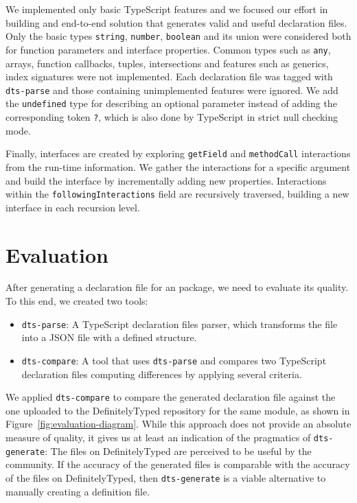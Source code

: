 \documentclass[english,cleveref,autoref,submission]{programming}
\newcommand{\figref}[1]{Figure~\ref{#1}}
\begin{document}
We implemented only basic TypeScript features and we focused our effort in building and end-to-end solution that generates valid and useful declaration files. Only the basic types \texttt{string}, \texttt{number}, \texttt{boolean} and its union were considered both for function parameters and interface properties. Common types such as \texttt{any}, arrays, function callbacks, tuples, intersections and features such as generics, index signatures were not implemented. Each declaration file was tagged with \texttt{dts-parse} and those containing unimplemented features were ignored. We add the \texttt{undefined} type for describing an optional parameter instead of adding the corresponding token \texttt{?}, which is also done by TypeScript in strict null checking mode\cite{typescript-optional-parameters-and-properties}.


Finally, interfaces are created by exploring \texttt{getField} and
\texttt{methodCall} interactions from the run-time information. We
gather the interactions for a specific argument and build the
interface by incrementally adding new properties. Interactions within
the \texttt{followingInteractions} field are recursively traversed,
building a new interface in each recursion level.

\section{Evaluation}
\label{sec:dts-generate-evaluation}
After generating a declaration file for an \NPM{} package, we need to
evaluate its quality. To this end, we created two tools:
\begin{itemize}
  \item \texttt{dts-parse}: A TypeScript declaration files parser, which transforms the file into a JSON file with a defined structure.
  \item \texttt{dts-compare}: A tool that uses \texttt{dts-parse} and compares two TypeScript declaration files computing differences by applying several criteria.
\end{itemize}

We applied \texttt{dts-compare} to compare the generated declaration file against the one uploaded to the DefinitelyTyped repository for the same module, as shown in \figref{fig:evaluation-diagram}. While this approach does not provide an absolute measure of quality, it gives us at least an indication of the pragmatics of \texttt{dts-generate}: The files on DefinitelyTyped
are perceived to be useful by the community. If the accuracy of the
generated files is comparable with the accuracy of the files on
DefinitelyTyped, then \texttt{dts-generate} is a viable alternative to
manually creating a definition file.
\end{document}
